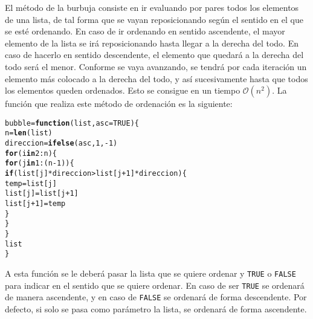 \documentclass[12pt]{report}\usepackage[]{graphicx}\usepackage[dvipsnames]{xcolor}
\makeatletter
\newcommand{\hlnum}[1]{\textcolor[rgb]{0.686,0.059,0.569}{#1}}%
\newcommand{\hlopt}[1]{\textcolor[rgb]{0,0,0}{#1}}%
\newcommand{\hlstd}[1]{\textcolor[rgb]{0.345,0.345,0.345}{#1}}%
\newcommand{\hlkwa}[1]{\textcolor[rgb]{0.161,0.373,0.58}{\textbf{#1}}}%
\newcommand{\hlkwb}[1]{\textcolor[rgb]{0.69,0.353,0.396}{#1}}%
\newcommand{\hlkwc}[1]{\textcolor[rgb]{0.333,0.667,0.333}{#1}}%
\newcommand{\hlkwd}[1]{\textcolor[rgb]{0.737,0.353,0.396}{\textbf{#1}}}%
\newenvironment{kframe}{%
 \def\at@end@of@kframe{}%
 \ifinner\ifhmode%
  \def\at@end@of@kframe{\end{minipage}}%
  \begin{minipage}{\columnwidth}%
 \fi\fi%
 \def\FrameCommand##1{\hskip\@totalleftmargin \hskip-\fboxsep
 \colorbox{shadecolor}{##1}\hskip-\fboxsep
     \hskip-\linewidth \hskip-\@totalleftmargin \hskip\columnwidth}%
 \MakeFramed {\advance\hsize-\width
   \@totalleftmargin\z@ \linewidth\hsize
   \@setminipage}}%
 {\par\unskip\endMakeFramed%
 \at@end@of@kframe}
\newenvironment{knitrout}{}{} %
\makeatother
\begin{document}
			El método de la burbuja consiste en ir evaluando por pares todos los elementos de una lista, de tal forma que se vayan reposicionando según el sentido en el que se esté ordenando. En caso de ir ordenando en sentido ascendente, el mayor elemento de la lista se irá reposicionando hasta llegar a la derecha del todo. En caso de hacerlo en sentido descendente, el elemento que quedará a la derecha del todo será el menor. Conforme se vaya avanzando, se tendrá por cada iteración un elemento más colocado a la derecha del todo, y así sucesivamente hasta que todos los elementos queden ordenados. Esto se consigue en un tiempo $\mathcal{O}(n^2)$. La función que realiza este método de ordenación es la siguiente:
			
\begin{knitrout}
\color{fgcolor}\begin{kframe}
\begin{alltt}
\hlstd{bubble} \hlkwb{=} \hlkwa{function}\hlstd{(}\hlkwc{list}\hlstd{,} \hlkwc{asc} \hlstd{=} \hlnum{TRUE}\hlstd{) \{}
        \hlstd{n} \hlkwb{=} \hlkwd{len}\hlstd{(list)}
        \hlstd{direccion} \hlkwb{=} \hlkwd{ifelse}\hlstd{(asc,} \hlnum{1}\hlstd{,} \hlopt{-}\hlnum{1}\hlstd{)}
        \hlkwa{for} \hlstd{(i} \hlkwa{in} \hlnum{2}\hlopt{:}\hlstd{n) \{}
                \hlkwa{for} \hlstd{(j} \hlkwa{in} \hlnum{1}\hlopt{:}\hlstd{(n}\hlopt{-}\hlnum{1}\hlstd{)) \{}
                        \hlkwa{if} \hlstd{(list[j]} \hlopt{*} \hlstd{direccion} \hlopt{>} \hlstd{list[j}\hlopt{+}\hlnum{1}\hlstd{]} \hlopt{*} \hlstd{direccion) \{}
                                \hlstd{temp} \hlkwb{=} \hlstd{list[j]}
                                \hlstd{list[j]} \hlkwb{=} \hlstd{list[j}\hlopt{+}\hlnum{1}\hlstd{]}
                                \hlstd{list[j}\hlopt{+}\hlnum{1}\hlstd{]} \hlkwb{=} \hlstd{temp}
                        \hlstd{\}}
                \hlstd{\}}
        \hlstd{\}}
        \hlstd{list}
\hlstd{\}}
\end{alltt}
\end{kframe}
\end{knitrout}
			
			A esta función se le deberá pasar la lista que se quiere ordenar y \texttt{TRUE} o \texttt{FALSE} para indicar en el sentido que se quiere ordenar. En caso de ser \texttt{TRUE} se ordenará de manera ascendente, y en caso de \texttt{FALSE} se ordenará de forma descendente. Por defecto, si solo se pasa como parámetro la lista, se ordenará de forma ascendente.\\
			
\end{document}
